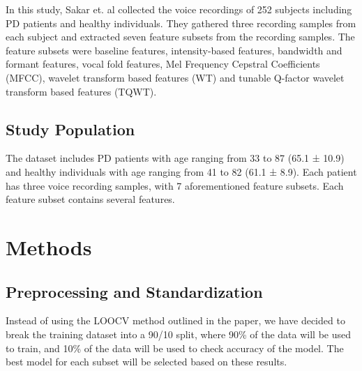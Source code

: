 \documentclass[
]{article}
\begin{document}
In this study, Sakar et. al collected the voice recordings of 252 subjects including PD patients and healthy individuals. They gathered three recording samples from each subject and extracted seven feature subsets from the recording samples. The feature subsets were baseline features, intensity-based features, bandwidth and formant features, vocal fold features, Mel Frequency Cepstral Coefficients (MFCC), wavelet transform based features (WT) and tunable Q-factor wavelet transform based features (TQWT).

\hypertarget{study-population}{%
\subsection{Study Population}\label{study-population}}

The dataset includes PD patients with age ranging from 33 to 87 (65.1 ± 10.9) and healthy individuals with age
ranging from 41 to 82 (61.1 ± 8.9). Each patient has three voice recording samples, with 7 aforementioned
feature subsets. Each feature subset contains several features.

\hypertarget{methods}{%
\section{Methods}\label{methods}}

\hypertarget{preprocessing-and-standardization}{%
\subsection{Preprocessing and Standardization}\label{preprocessing-and-standardization}}

Instead of using the LOOCV method outlined in the paper, we have decided to break the training dataset into a 90/10 split, where 90\% of the data will be used to train, and 10\% of the data will be used to check accuracy of the model. The best model for each subset will be selected based on these results.
\end{document}
